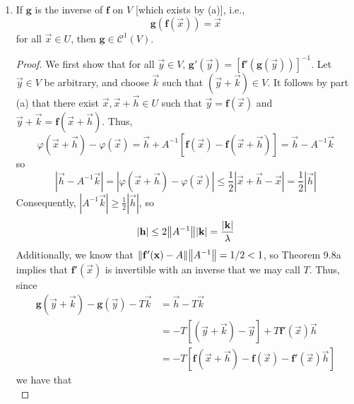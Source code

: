 \documentclass[../notes.tex]{subfiles}
\begin{document}
\begin{itemize}
\begin{enumerate}[label={(\alph*)}]
\begin{proof}
        \end{proof}
        \item If $\mathbf{g}$ is the inverse of $\mathbf{f}$ on $V$ [which exists by (a)], i.e.,
        \begin{equation*}
            \mathbf{g}(\mathbf{f}(\vec{x})) = \vec{x}
        \end{equation*}
        for all $\vec{x}\in U$, then $\mathbf{g}\in\mathscr{C}^1(V)$.
        \begin{proof}
            We first show that for all $\vec{y}\in V$, $\mathbf{g}'(\vec{y})=[\mathbf{f}'(\mathbf{g}(\vec{y}))]^{-1}$. Let $\vec{y}\in V$ be arbitrary, and choose $\vec{k}$ such that $(\vec{y}+\vec{k})\in V$. It follows by part (a) that there exist $\vec{x},\vec{x}+\vec{h}\in U$ such that $\vec{y}=\mathbf{f}(\vec{x})$ and $\vec{y}+\vec{k}=\mathbf{f}(\vec{x}+\vec{h})$. Thus,
            \begin{equation*}
                \varphi(\vec{x}+\vec{h})-\varphi(\vec{x}) = \vec{h}+A^{-1}[\mathbf{f}(\vec{x})-\mathbf{f}(\vec{x}+\vec{h})]
                = \vec{h}-A^{-1}\vec{k}
            \end{equation*}
            so
            \begin{equation*}
                |\vec{h}-A^{-1}\vec{k}| = |\varphi(\vec{x}+\vec{h})-\varphi(\vec{x})|
                \leq \frac{1}{2}|\vec{x}+\vec{h}-\vec{x}|
                = \frac{1}{2}|\vec{h}|
            \end{equation*}
            Consequently, $|A^{-1}\vec{k}|\geq\frac{1}{2}|\vec{h}|$, so
            \begin{equation*}
                |\mathbf{h}| \leq 2\norm{A^{-1}}|\mathbf{k}|
                = \frac{|\mathbf{k}|}{\lambda}
            \end{equation*}
            Additionally, we know that $\norm{\mathbf{f}'(\mathbf{x})-A}\norm{A^{-1}}=1/2<1$, so Theorem 9.8a implies that $\mathbf{f}'(\vec{x})$ is invertible with an inverse that we may call $T$. Thus, since
            \begin{align*}
                \mathbf{g}(\vec{y}+\vec{k})-\mathbf{g}(\vec{y})-T\vec{k} &= \vec{h}-T\vec{k}\\
                &= -T[(\vec{y}+\vec{k})-\vec{y}]+T\mathbf{f}'(\vec{x})\vec{h}\\
                &= -T[\mathbf{f}(\vec{x}+\vec{h})-\mathbf{f}(\vec{x})-\mathbf{f}'(\vec{x})\vec{h}]
            \end{align*}
            we have that
            \begin{equation*}

\end{equation*}
\end{proof}
\end{enumerate}
\end{itemize}
\end{document}
